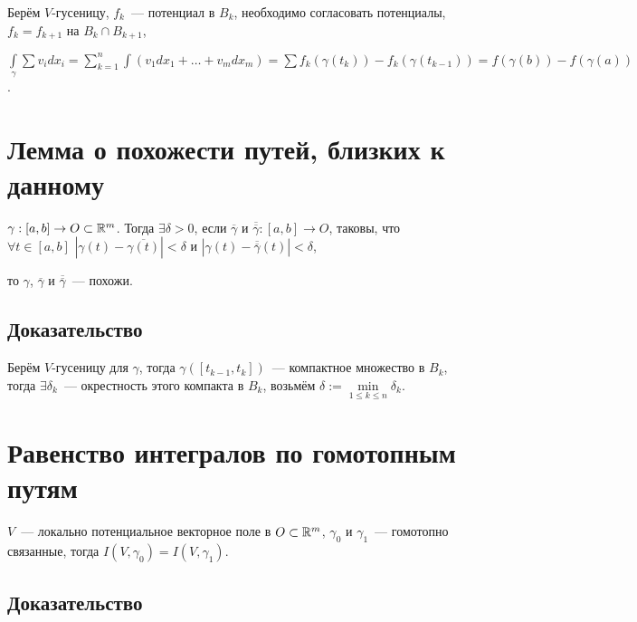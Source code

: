 \documentclass{article}
\begin{document}
            Берём $V$-гусеницу, $f_k$~--- потенциал в $B_k$, необходимо согласовать потенциалы, $f_k = f_{k + 1}$ на $B_k \cap B_{k + 1}$,
            
            $\int\limits_{\gamma} \sum v_i dx_i = \sum\limits^n_{k = 1} \int \left( v_1 dx_1 + \ldots + v_m dx_m \right) = \sum f_k \left( \gamma(t_k) \right) - f_k \left( \gamma (t_{k - 1}) \right) = f \left( \gamma(b) \right) - f \left( \gamma(a) \right)$.
            
    \newpage
    
    \section{Лемма о похожести путей, близких к данному}
    
        $\gamma : [a, b] \rightarrow O \subset \mathbb{R}^m$. Тогда $\exists \delta > 0$, если $\overline{\gamma}$ и $\overline{\overline{\gamma}} : [a, b] \rightarrow O$, таковы, что $\forall t \in [a, b]$ $|\gamma(t) - \overline{\gamma(t)}| < \delta$ и $|\gamma(t) - \overline{\overline{\gamma}}(t)| < \delta$,
        
        то $\gamma$, $\overline{\gamma}$ и $\overline{\overline{\gamma}}$~--- похожи.
        
        \subsection{Доказательство}
        
            Берём $V$-гусеницу для $\gamma$, тогда $\gamma \left( [t_{k - 1}, t_k ] \right)$~--- компактное множество в $B_k$, тогда $\exists \delta_k$~--- окрестность этого компакта в $B_k$, возьмём $\delta := \min\limits_{1 \leq k \leq n} \delta_k$.
            
    \newpage
    
    \section{Равенство интегралов по гомотопным путям}
    
        $V$~--- локально потенциальное векторное поле в $O \subset \mathbb{R}^m$, $\gamma_0$ и $\gamma_1$~--- гомотопно связанные, тогда $I(V, \gamma_0) = I(V, \gamma_1)$.
        
        \subsection{Доказательство}
        
\end{document}
